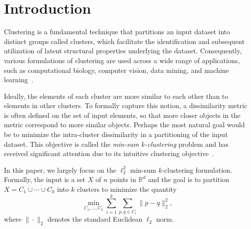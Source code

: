 \documentclass[11pt]{article}
\begin{document}

\thispagestyle{empty}
\newpage
\setcounter{page}{1}


\section{Introduction}
Clustering is a fundamental technique that partitions an input dataset into distinct groups called clusters, which facilitate the identification and subsequent utilization of latent structural properties underlying the dataset. 
Consequently, various formulations of clustering are used across a wide range of applications, such as computational biology, computer vision, data mining, and machine learning~\cite{jain1999data,xu2005survey}. 

Ideally, the elements of each cluster are more similar to each other than to elements in other clusters. 
To formally capture this notion, a dissimilarity metric is often defined on the set of input elements, so that more closer objects in the metric correspond to more similar objects. 
Perhaps the most natural goal would be to minimize the intra-cluster dissimilarity in a partitioning of the input dataset. 
This objective is called the \emph{min-sum $k$-clustering} problem and has received significant attention due to its intuitive clustering objective~\cite{Guttmann-BeckH98a,Indyk99,Matousek00,Schulman00,BartalCR01,VegaKKR03,CzumajS07,AloiseDHP09,BehsazFSS19,BanerjeeOR21,Cohen-AddadSL21}. 

In this paper, we largely focus on the $\ell_2^2$ min-sum $k$-clustering formulation. 
Formally, the input is a set $X$ of $n$ points in $\mathbb{R}^d$ and the goal is to partition $X=C_1\dot\cup\cdots\dot\cup C_k$ into $k$ clusters to minimize the quantity
\[\min_{C_1,\ldots,C_k}\sum_{i=1}^k\sum_{p,q\in C_i}\|p-q\|_2^2,\]
where $\|\cdot\|_2$ denotes the standard Euclidean $\ell_2$ norm. 
\end{document}

